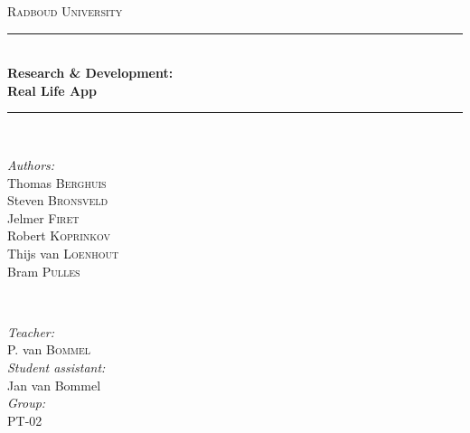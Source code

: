 \documentclass[main.tex]{subfiles}
\begin{document}
\begin{titlepage}
    \newcommand{\HRule}{\rule{\linewidth}{0.5mm}} 

    \center 
    \textsc{\LARGE Radboud University}\\[0.5cm] 

    \HRule \\[0.4cm]
        {\huge \bfseries Research \& Development:\\ Real Life App}\\[0.3cm] 
    \HRule \\[1.5cm]

    \begin{figure}[ht]
     	\centering
    \end{figure}

    \begin{minipage}{0.4\textwidth}
        \begin{flushleft} \large
            \emph{Authors:}\\
            Thomas \textsc{Berghuis} \\
            Steven \textsc{Bronsveld} \\
            Jelmer \textsc{Firet} \\
            Robert \textsc{Koprinkov} \\
            Thijs van \textsc{Loenhout} \\
            Bram \textsc{Pulles} \\
        \end{flushleft}
    \end{minipage}
    ~
    \begin{minipage}{0.4\textwidth}
        \begin{flushright} \large
            \emph{Teacher:} \\
            P. van \textsc{Bommel} \\
            \emph{Student assistant:} \\
            Jan van Bommel \\
            \emph{Group:} \\
            PT-02
        \end{flushright}
    \end{minipage}\\[2cm]

    \vfill 

\end{titlepage}
\end{document}
